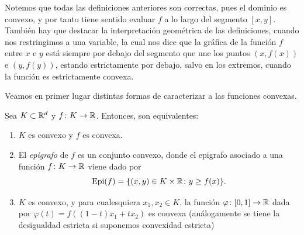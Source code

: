Notemos que todas las definiciones anteriores son correctas, pues el dominio es convexo, y por tanto tiene sentido evaluar $f$ a lo largo del segmento $[x,y]$. También hay que destacar la interpretación geométrica de las definiciones, cuando nos restringimos a una variable, la cual nos dice que la gráfica de la función $f$ entre $x$ e $y$ está siempre por debajo del segmento que une los puntos $(x,f(x))$ e $(y,f(y))$, estando estrictamente por debajo, salvo en los extremos, cuando la función es estrictamente convexa.

Veamos en primer lugar distintas formas de caracterizar a las funciones convexas.

\begin{prop}
    Sea $K \subset \mathbb{R}^d$ y $f\colon K \to \mathbb{R}$. Entonces, son equivalentes:
    \begin{enumerate}
        \item $K$ es convexo y $f$ es convexa. \label{item:prop_convex:1}
        \item El \emph{epigrafo} de $f$ es un conjunto convexo, donde el epigrafo asociado a una función $f \colon K \to \mathbb{R}$ viene dado por
        \[ \operatorname{Epi}(f) = \{(x,y) \in K \times \mathbb{R} \colon y \ge f(x) \}. \] \label{item:prop_convex:2}
        \item $K$ es convexo, y para cualesquiera $x_1,x_2 \in K$, la función $\varphi\colon [0,1] \to \mathbb{R}$ dada por $\varphi(t) = f((1-t)x_1 + tx_2)$ es convexa (análogamente se tiene la desigualdad estricta si suponemos convexidad estricta) \label{item:prop_convex:3}
    \end{enumerate}
\end{prop}

